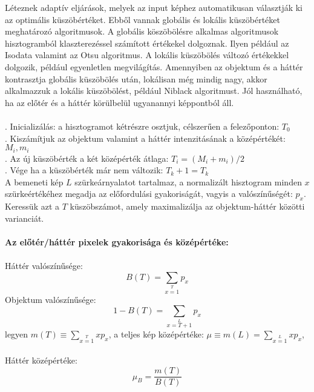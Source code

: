 Léteznek adaptív eljárások, melyek az input képhez automatikusan választják ki az optimális küszöbértéket. Ebből vannak globális és lokális küszöbértéket meghatározó algoritmusok. A globális köszöbölésre alkalmas algoritmusok hisztogramból klaszterezéssel számított értékekel dolgoznak. Ilyen például az Isodata valamint az Otsu algoritmus. A lokális küszöbölés változó értékekkel dolgozik, például egyenletlen megvilágítás. Amennyiben az objektum és a háttér kontrasztja globális küszöbölés után, lokálisan még mindig nagy, akkor alkalmazzuk a lokális küszöbölést, például Niblack algoritmust.
Jól használható, ha az előtér és a háttér körülbelül ugyanannyi képpontból áll.\\\\
. Inicializálás: a hisztogramot kétrészre osztjuk, célszerűen a felezőponton: $T_0$ \\
. Kiszámítjuk az objektum valamint a háttér intenzitásának a középértékét: $M_i, m_i$\\ 
. Az új küszöbérték a két középérték átlaga: $T_i=(M_i+m_i)/2$ \\
. Vége ha a küszöbérték már nem változik: $T_k+1=T_k$ \\ 
A bemeneti kép $L$ szürkeárnyalatot tartalmaz, a normalizált hisztogram minden $x$ szürkeértékéhez megadja az előfordulási gyakoriságát, vagyis a valószínűségét: $p_x$. Keressük azt a $T$ küszöbszámot, amely maximalizálja az objektum-háttér közötti varianciát.\\\\
\textbf{Az előtér/háttér pixelek gyakorisága és középértéke:}\\\\
\indent Háttér valószínűsége:
\begin{equation*}
B(T)=\sum\limits_{x=1}\limits^{T}p_x 
\end{equation*}
\indent Objektum valószínűsége:
\begin{equation*}
1-B(T)=\sum\limits_{x=T+1}\limits^{L}p_x
\end{equation*}
\indent legyen $m(T)\equiv \sum\limits_{x=1}\limits^{T}xp_x$, a teljes kép középértéke: $\mu \equiv m(L) = \sum\limits_{x=1}\limits^{L}xp_x$,\\ \\
\indent Háttér középértéke:
\begin{equation*}
\mu_B =\frac{m(T)}{B(T)}
\end{equation*}
